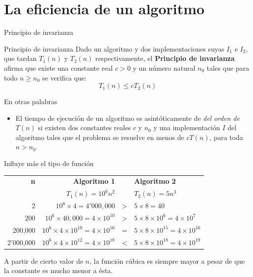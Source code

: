\section{La eficiencia de un algoritmo}

\begin{frame}[c]{Principio de invarianza}
  \begin{block}{Principio de invarianza}
    Dado un algoritmo y dos implementaciones suyas $I_1$ e $I_2$, que tardan
    $T_1(n)$ y $T_2(n)$ respectivamente, el \textbf{Principio de invarianza}
    afirma que existe una constante real $c > 0$ y un número natural $n_0$
    tales que para todo $n \geq n_0$ se verifica que:
    \[
      T_1(n) \leq cT_2(n)
    \]
  \end{block}
\end{frame}

\begin{frame}[c]{En otras palabras}
  \begin{itemize}
    \item El tiempo de ejecución de un algoritmo es asintóticamente de
      \textit{del orden de } $T(n)$ si existen dos constantes reales
      $c$ y $n_0$ y una implementación $I$ del algoritmo tales que el
      problema se resuelve en menos de $cT(n)$, para toda $n > n_0$.
  \end{itemize}
\end{frame}

\begin{frame}[c]{Influye más el tipo de función}
  \begin{table}[]
  \begin{tabular}{rrcl}
    \textbf{n} &  \textbf{Algoritmo 1} &   &  \textbf{Algoritmo 2} \\
       & $T_1(n) = 10^6n^2$  &   & $T_2(n) = 5n^3$  \\ 
         2 & $10^6 \times 4 = 4'000,000$ & > & $5 \times 8 = 40$ \\
       200 & $10^6 \times 40,000 = 4 \times 10^{10}$ & > & $5 \times 8 \times 10^6 = 4 \times 10^7$  \\
       200,000 & $10^6 \times 4 \times 10^{10} = 4 \times 10^{16}$ & = & $5 \times 8 \times 10^{15} = 4 \times 10^{16}$  \\
       2'000,000 & $10^6 \times 4 \times 10^{12} = 4 \times 10^{18}$ & < & $5 \times 8 \times 10^{18} = 4 \times 10^{19}$  \\
  \end{tabular}
  \end{table}

  \vspace{\baselineskip}
  A partir de cierto valor de $n$, la función cúbica es siempre mayor a
  pesar de que la constante es mucho menor a ésta.
\end{frame}


